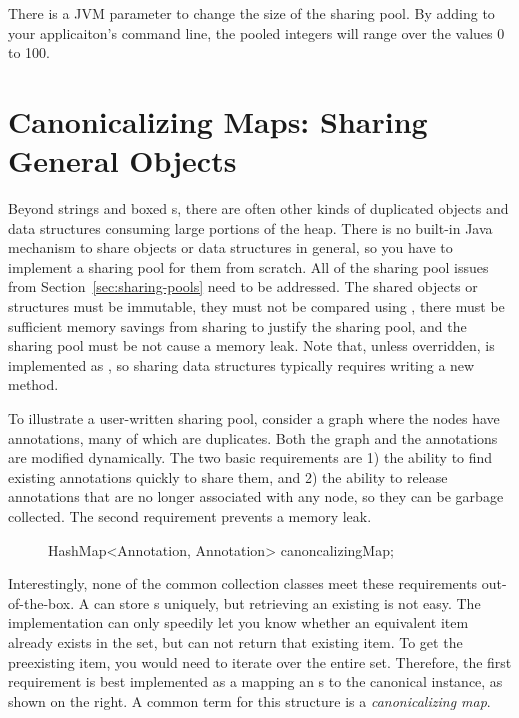 There is a JVM parameter to change the size of the  sharing pool.
By adding  to your applicaiton's command line, the
pooled integers will range over the values 0 to 100.

\section{Canonicalizing Maps: Sharing General Objects}

Beyond strings and boxed s, there are often other kinds of
duplicated objects and data structures consuming large portions of the heap. 
There is no built-in Java mechanism to share objects or data
structures in general, so you have to implement a sharing pool for them from
scratch. All of the sharing pool issues from Section~\ref{sec:sharing-pools} need to be
addressed. The shared objects or structures must be immutable, they must not be
compared using \code{==}, there must be sufficient memory savings from sharing
to justify the sharing pool, and the sharing pool must be not cause a memory leak. 
Note that, unless overridden,  is
implemented as \code{==}, so sharing data structures typically requires writing
a new  method.

To illustrate a user-written sharing pool, consider a graph where the nodes
have annotations, many of which are duplicates. Both the graph and the
annotations are modified dynamically. The two basic requirements are 1) the
ability to find existing annotations quickly to share them, and 2) the ability
to release annotations that are no longer associated with any node, so they can
be garbage collected.  The second requirement prevents a memory leak. 

\begin{figure}
\centering
\begin{framedlisting}
HashMap<Annotation, Annotation> canoncalizingMap;
\end{framedlisting}
\end{figure}
Interestingly, none of the common collection classes meet these requirements
out-of-the-box. A  can store s uniquely, but
retrieving an existing  is not easy. The 
implementation can only speedily let you know whether an equivalent item already
exists in the set, but can not return that existing item. To get the preexisting
item, you would need to iterate over the entire set. Therefore, the first
requirement is best implemented as a  mapping an
s to the canonical instance, as shown on the right. A common
term for this structure is a \emph{canonicalizing map}.

